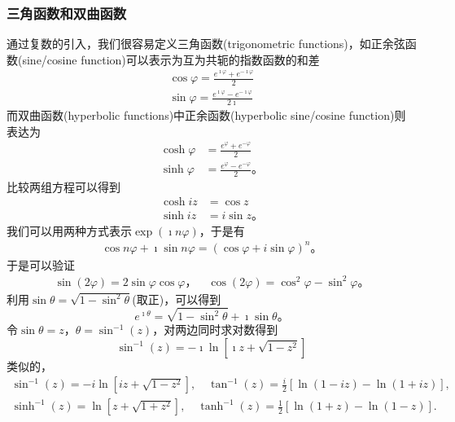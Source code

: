 \subsubsection{三角函数和双曲函数}
通过复数的引入，我们很容易定义三角函数(trigonometric functions)，如正余弦函数(sine/cosine function)可以表示为互为共轭的指数函数的和差
\begin{align}
    \cos \varphi = \frac{e^{\imath \varphi} + e^{ -\imath \varphi} }{2}
    \\
    \sin \varphi = \frac{e^{\imath \varphi} - e^{ -\imath \varphi} }{2\imath}
\end{align}
而双曲函数(hyperbolic functions)中正余函数(hyperbolic sine/cosine function)则表达为
\begin{align}
    \cosh \varphi &= \frac{e^{\varphi} + e^{ - \varphi} }{2}
    \\
    \sinh \varphi &= \frac{e^{\varphi} - e^{ - \varphi} }{2} \textrm{。}
\end{align}
比较两组方程可以得到
\begin{align}
    \cosh iz &= \cos z
    \\
    \sinh iz &= i \sin z\textrm{。}
\end{align}
我们可以用两种方式表示$\exp(\imath n \varphi)$，于是有
\begin{align}
    \cos n \varphi + \imath \sin n\varphi = (\cos \varphi + i \sin \varphi)^n  \textrm{。}
\end{align}
于是可以验证
\begin{align}
    \sin(2\varphi) = 2\sin\varphi \cos\varphi\textrm{，} \quad \cos (2\varphi) = \cos^2\varphi - \sin^2\varphi \textrm{。}
\end{align}
利用$\sin \theta = \sqrt{1 - \sin ^2 \theta }$(取正)，可以得到
\begin{equation}
  e^{\imath \theta} = \sqrt{ 1 - \sin ^2 \theta } + \imath \sin \theta \textrm{。}  
\end{equation} 
令$\sin \theta = z$，$\theta = \sin^{-1} (z)$，对两边同时求对数得到
\begin{equation}
    \sin^{-1} (z) = -\imath \ln \left[ \imath z + \sqrt{1-z^2} \right]
\end{equation}
类似的，
\begin{equation}
    \begin{array}{cc}
    \sin ^{-1}(z)=-i \ln \left[i z+\sqrt{1-z^2}\right], \quad \tan ^{-1}(z)=\frac{i}{2}[\ln (1-i z)-\ln (1+i z)], \\
    \sinh ^{-1}(z)=\ln \left[z+\sqrt{1+z^2}\right], \quad \tanh ^{-1}(z)=\frac{1}{2}[\ln (1+z)-\ln (1-z)] .
    \end{array}
\end{equation}

